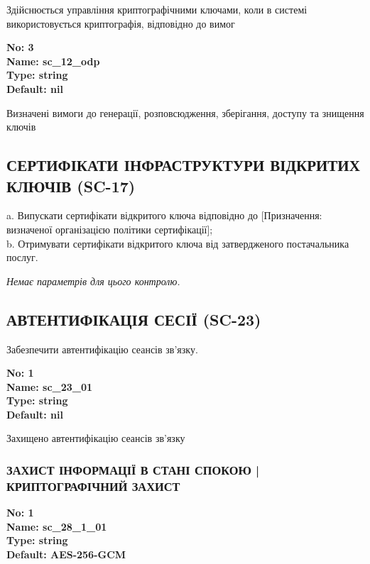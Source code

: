 \documentclass{article}
\begin{document}
{\footnotesize Здійснюється управління криптографічними ключами, коли в системі використовується криптографія, відповідно до вимог }


{\footnotesize\bfseries
No: 3\\
Name: sc\_\allowbreak{}12\_\allowbreak{}odp\\
Type: string\\
Default: nil
}

{\footnotesize Визначені вимоги до генерації, розповсюдження, зберігання, доступу та знищення ключів}




\subsection{СЕРТИФІКАТИ ІНФРАСТРУКТУРИ ВІДКРИТИХ КЛЮЧІВ (SC-17)}
a. Випускати сертифікати відкритого ключа відповідно до [Призначення: визначеної організацією політики сертифікації];\\ 
b. Отримувати сертифікати відкритого ключа від затвердженого постачальника послуг.

\vspace{10pt}
\textit{Немає параметрів для цього контролю.}
\vspace{10pt}


\subsection{АВТЕНТИФІКАЦІЯ СЕСІЇ (SC-23)}
Забезпечити автентифікацію сеансів зв'язку.

\vspace{10pt}
{\footnotesize\bfseries
No: 1\\
Name: sc\_\allowbreak{}23\_\allowbreak{}01\\
Type: string\\
Default: nil
}

{\footnotesize Захищено автентифікацію сеансів зв'язку}




\subsubsection{ЗАХИСТ ІНФОРМАЦІЇ В СТАНІ СПОКОЮ | КРИПТОГРАФІЧНИЙ ЗАХИСТ}


\vspace{10pt}
{\footnotesize\bfseries
No: 1\\
Name: sc\_\allowbreak{}28\_\allowbreak{}1\_\allowbreak{}01\\
Type: string\\
Default: \textquotedbl{}AES-256-GCM\textquotedbl{}
}
\end{document}
